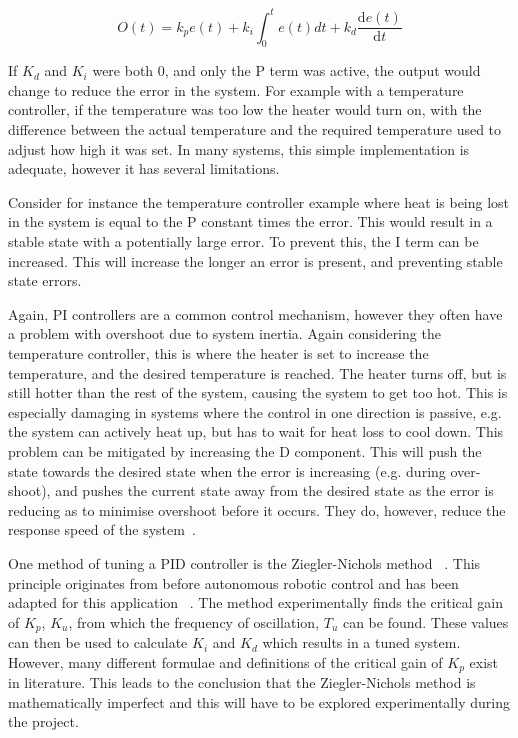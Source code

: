 \begin{equation}
\label{eqn:pid}
O(t) = k_{p}e(t) + k_i\int_{0}^{t}e(t)dt + k_d \frac{\mathrm{d} e(t) }{\mathrm{d} t}
\end{equation}

If $K_d$ and $K_i$ were both 0, and only the P term was active, the output 
would change to reduce the error in the system. For example with a
temperature controller, if the temperature was too low the heater would
turn on, with the difference between the actual temperature and the required 
temperature used to adjust how high it was set. In many systems, this simple 
implementation is adequate, however it has several limitations. 

Consider for instance the temperature controller example where heat is being
lost in the system is equal to the P constant times the error. This would
result in a stable state with a potentially large error. To prevent this,
the I term can be increased. This will increase the longer an error is
present, and preventing stable state errors. 

Again, PI controllers are a common control mechanism, however they often have 
a problem with overshoot due to system inertia. Again considering the 
temperature controller, this is where the heater is set to increase the 
temperature, and the desired temperature is reached. The heater turns off, but 
is still hotter than the rest of the system, causing the system to get too hot. 
This is especially damaging in systems where the control in one direction 
is passive, e.g. the system can actively heat up, but has to wait for heat loss 
to cool down. This problem can be mitigated by increasing the D component. 
This will push the state towards the desired state when the error is increasing 
(e.g. during over-shoot), and pushes the current state away from the desired 
state as the error is reducing as to minimise overshoot before it 
occurs. They do, however, reduce the response speed of the system~\cite{chen2007linear}.

One method of tuning a PID controller is the Ziegler-Nichols method~
\cite{ziegler1942optimum}. This principle originates from before autonomous 
robotic control and has been adapted for this application~
\cite{aastrom2004revisiting}. The method experimentally finds the critical gain 
of $K_p$, $K_u$, from which the frequency of oscillation, $T_u$ can be found. 
These values can then be used to calculate $K_i$ and $K_d$ which results in a 
tuned system. However, many different formulae and definitions of the critical 
gain of $K_p$ exist in literature. This leads to the conclusion that the 
Ziegler-Nichols method is mathematically imperfect and this will have to be 
explored experimentally during the project.




